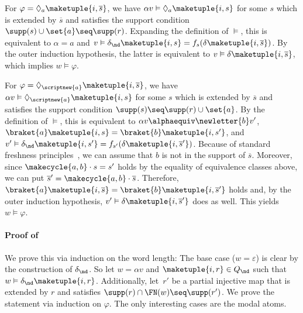 \documentclass[10pt, final, conference, a4paper, twocolumn]{IEEEtran}
\begin{document}
    For $\varphi = \Diamond_a \maketuple{i, \overline{s}}$, we have
    $\alpha v \vDash \Diamond_a \maketuple{i, s}$ for some $s$ which is extended by $\overline{s}$ and
    satisfies the support condition $\supp(s) \cup \set{a} \seq \supp(r)$. Expanding the definition of
    $\vDash$, this is equivalent to $\alpha = a$ and $v \vDash \delta_{\nd}\maketuple{i, s} =
    f_s(\delta\maketuple{i, \overline{s}})$. By the outer induction hypothesis, the latter is equivalent to
    $v \vDash \delta\maketuple{i, \overline{s}}$, which implies $w \vDash \varphi$.

    For $\varphi = \Diamond_{\scriptnew{a}} \maketuple{i, \overline{s}}$, we have
    $\alpha v \vDash \Diamond_{\scriptnew{a}} \maketuple{i, s}$ for some $s$ which is extended by $\overline{s}$
    and satisfies the support condition $\supp(s) \seq \supp(r) \cup \set{a}$. By the definition of $\vDash$,
    this is equivalent to $\alpha v \alphaequiv \newletter{b}v'$, $\braket{a}\maketuple{i, s} = \braket{b}%
    \maketuple{i,s'}$, and $v' \vDash \delta_{\nd}\maketuple{i,s'} = f_{s'}(\delta\maketuple{i,\overline{s}'})$.
    Because of standard freshness principles~\cite{Pitts2013}, we can assume that $b$ is not in the support of $\overline{s}$. 
    Moreover, since $\makecycle{a,b} \cdot s = s'$ holds by the equality of equivalence classes above, we can put $\overline{s}' = \makecycle{a,b} \cdot \overline{s}$. 
    Therefore, $\braket{a}\maketuple{i,\overline{s}} = \braket{b}\maketuple{i,\overline{s}'}$ holds and, by the outer induction hypothesis, $v' \vDash \delta\maketuple{i,\overline{s}'}$ does as well. 
    This yields $w \vDash \varphi$.

\paragraph*{Proof of~}

  We prove this via induction on the word length: The base case ($w=\varepsilon$) is clear by the construction of $\delta_{\nd}$.
  So let $w = \alpha v$ and $\maketuple{i, r} \in Q_{\nd}$ such that $w \vDash \delta_{\nd}\maketuple{i, r}$.
  Additionally, let~$r'$ be a partial injective map that is extended by $r$ and satisfies $\supp(r) \cap \FN(w) \seq \supp(r')$.
  We prove the statement via induction on $\varphi$. The only interesting cases are the modal atoms.
\end{document}

